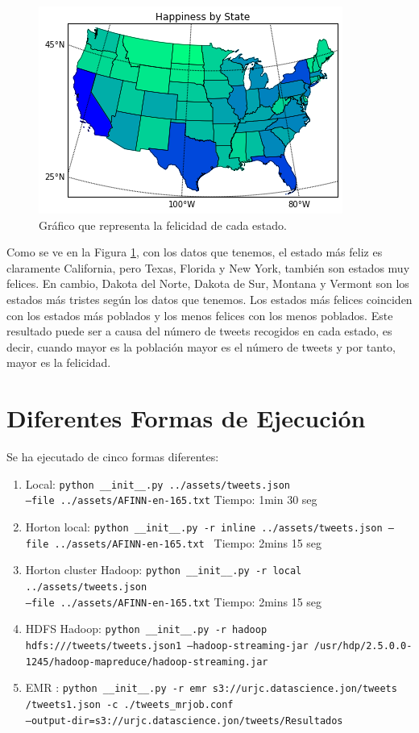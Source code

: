 \documentclass[12pt,a4paper]{article}
\begin{document}
\begin{figure}[h]
\centering
\includegraphics[scale=1]{happiness.png}
\caption{Gráfico que representa la felicidad de cada estado.}
\label{hap-stat}
\end{figure}

Como se ve en la Figura \ref{hap-stat}, con los datos que tenemos, el estado más feliz es claramente California, pero Texas, Florida y New York, también son estados muy felices. En cambio, Dakota del Norte, Dakota de Sur, Montana y Vermont son los estados más tristes según los datos que tenemos. Los estados más felices coinciden con los estados más poblados  y los menos felices con los menos poblados. Este resultado puede ser a causa del número de tweets recogidos en cada estado, es decir, cuando mayor es la población mayor es el número de tweets y por tanto, mayor es la felicidad.

\section{Diferentes Formas de Ejecución}

Se ha ejecutado de cinco formas diferentes:
\begin{enumerate}
\item Local: \texttt{python \_\_init\_\_.py ../assets/tweets.json \\--file ../assets/AFINN-en-165.txt} Tiempo: 1min 30 seg
\item Horton local: \texttt{python \_\_init\_\_.py -r inline ../assets/tweets.json  --file ../assets/AFINN-en-165.txt } Tiempo: 2mins 15 seg
\item Horton cluster Hadoop: \texttt{python \_\_init\_\_.py -r local ../assets/tweets.json  \\ --file ../assets/AFINN-en-165.txt} Tiempo: 2mins 15 seg
\item HDFS Hadoop: \texttt{python \_\_init\_\_.py -r hadoop \\ hdfs:///tweets/tweets.json1 --hadoop-streaming-jar /usr/hdp/2.5.0.0-1245/hadoop-mapreduce/hadoop-streaming.jar}
\item EMR : \texttt{python \_\_init\_\_.py -r emr s3://urjc.datascience.jon/tweets\\/tweets1.json -c ./tweets\_mrjob.conf \\--output-dir=s3://urjc.datascience.jon/tweets/Resultados}
\end{enumerate}
\end{document}
